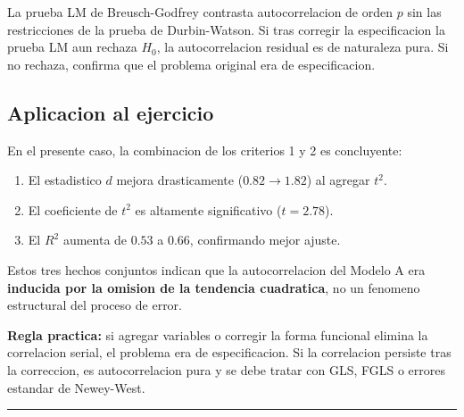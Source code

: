 \documentclass[12pt, letterpaper]{article}
\begin{document}
La prueba LM de Breusch-Godfrey contrasta autocorrelacion de orden $p$ sin las
restricciones de la prueba de Durbin-Watson. Si tras corregir la especificacion
la prueba LM aun rechaza $H_0$, la autocorrelacion residual es de naturaleza pura.
Si no rechaza, confirma que el problema original era de especificacion.

\subsection{Aplicacion al ejercicio}

En el presente caso, la combinacion de los criterios 1 y 2 es concluyente:
\begin{enumerate}[leftmargin=1.8em, itemsep=4pt]
  \item El estadistico $d$ mejora drasticamente ($0.82 \to 1.82$) al agregar $t^2$.
  \item El coeficiente de $t^2$ es altamente significativo ($t = 2.78$).
  \item El $R^2$ aumenta de $0.53$ a $0.66$, confirmando mejor ajuste.
\end{enumerate}
Estos tres hechos conjuntos indican que la autocorrelacion del Modelo A era
\textbf{inducida por la omision de la tendencia cuadratica}, no un fenomeno
estructural del proceso de error.

\begin{clave}
  \textbf{Regla practica:} si agregar variables o corregir la forma funcional
  elimina la correlacion serial, el problema era de especificacion.
  Si la correlacion persiste tras la correccion, es autocorrelacion pura
  y se debe tratar con GLS, FGLS o errores estandar de Newey-West.
\end{clave}

\vspace{14pt}
\noindent\rule{\linewidth}{0.4pt}

\end{document}
